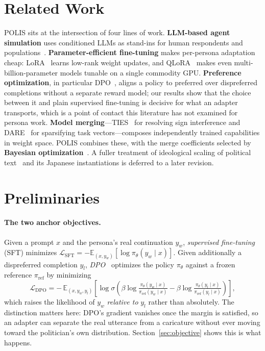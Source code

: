 \documentclass[11pt,letterpaper]{article}
\begin{document}
\section{Related Work}
POLIS sits at the intersection of four lines of work. \textbf{LLM-based agent simulation} uses conditioned LLMs as stand-ins for human respondents and populations~\cite{argyle2023out}. \textbf{Parameter-efficient fine-tuning} makes per-persona adaptation cheap: LoRA~\cite{hu2022lora} learns low-rank weight updates, and QLoRA~\cite{dettmers2023qlora} makes even multi-billion-parameter models tunable on a single commodity GPU. \textbf{Preference optimization}, in particular DPO~\cite{rafailov2023direct}, aligns a policy to preferred over dispreferred completions without a separate reward model; our results show that the choice between it and plain supervised fine-tuning is decisive for what an adapter transports, which is a point of contact this literature has not examined for persona work. \textbf{Model merging}---TIES~\cite{yadav2023ties} for resolving sign interference and DARE~\cite{yu2024language} for sparsifying task vectors---composes independently trained capabilities in weight space. POLIS combines these, with the merge coefficients selected by \textbf{Bayesian optimization}~\cite{shahriari2016taking,akiba2019optuna}. A fuller treatment of ideological scaling of political text~\cite{slapin2008scaling,laver2003extracting,kaneko2026extracting} and its Japanese instantiations is deferred to a later revision.

\section{Preliminaries}
\paragraph{The two anchor objectives.} Given a prompt $x$ and the persona's real continuation $y_w$, \emph{supervised fine-tuning} (SFT) minimizes $\mathcal{L}_{\text{SFT}} = -\mathbb{E}_{(x,y_w)}[\log \pi_\theta(y_w \mid x)]$. Given additionally a dispreferred completion $y_l$, \emph{DPO}~\cite{rafailov2023direct} optimizes the policy $\pi_\theta$ against a frozen reference $\pi_{\text{ref}}$ by minimizing
\[
\mathcal{L}_{\text{DPO}} = -\,\mathbb{E}_{(x,y_w,y_l)}\!\left[\log \sigma\!\left(\beta \log \tfrac{\pi_\theta(y_w\mid x)}{\pi_{\text{ref}}(y_w\mid x)} - \beta \log \tfrac{\pi_\theta(y_l\mid x)}{\pi_{\text{ref}}(y_l\mid x)}\right)\right],
\]
which raises the likelihood of $y_w$ \emph{relative to} $y_l$ rather than absolutely. The distinction matters here: DPO's gradient vanishes once the margin is satisfied, so an adapter can separate the real utterance from a caricature without ever moving toward the politician's own distribution. Section~\ref{sec:objective} shows this is what happens.
\end{document}
